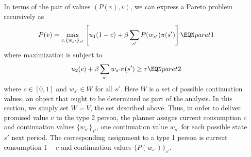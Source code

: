 





In terms of the pair of values
$(P(v),v)$,
 we can express a Pareto problem recursively as
$$ P(v) = \max_{c, \{w_{s'} \}_{s'} } \left[ u_1(1-c) 
   + \beta \sum_{s'} P(w_{s'}) \pi(s') \right] \EQN paret1 $$
where  maximization is subject to
$$ u_2(c) + \beta \sum_{s'} w_{s'} \pi(s') \geq v \EQN paret2 $$
where $c \in [0,1]$ and $w_{s'} \in W$ for all $s'$.  Here $W$ is a set of
possible continuation values, an object that ought to be determined as part of the analysis.
In this section, we simply set $W = V$, the set described above.
Thus, in order to deliver promised value $v$ to the type 2
person, the planner assigns current consumption $c$
and continuation values $\{w_{s'}\}_{s'}$, one continuation
value $w_{s'}$ for each possible state $s'$ next period.
The corresponding assignment to a type 1 person is
current consumption $1-c$ and continuation values
$\{P(w_{s'})\}_{s'}$. 



